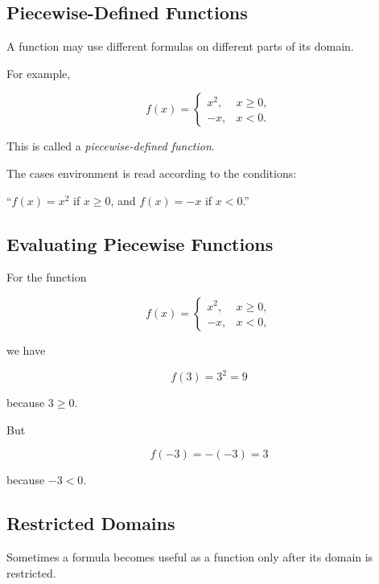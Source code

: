 \subsection{Piecewise-Defined Functions}
\label{subsec:piecewise-functions}

A function may use different formulas on different parts of its domain.

For example,

\[ f(x)=
\begin{cases}
x^2,&x\geq0,\\
-x,&x<0.
\end{cases} \]

This is called a \emph{piecewise-defined function}.

The cases environment is read according to the conditions:

\begin{center}
``\(f(x)=x^2\) if \(x\geq0\), and \(f(x)=-x\) if \(x<0\).''
\end{center}

\subsection{Evaluating Piecewise Functions}
\label{subsec:evaluating-piecewise}

For the function

\[ f(x)=
\begin{cases}
x^2,&x\geq0,\\
-x,&x<0,
\end{cases} \]

we have

\[ f(3)=3^2=9 \]

because \(3\geq0\).

But

\[ f(-3)=-(-3)=3 \]

because \(-3<0\).

\subsection{Restricted Domains}
\label{subsec:restricted-domains}

Sometimes a formula becomes useful as a function only after its domain is
restricted.

